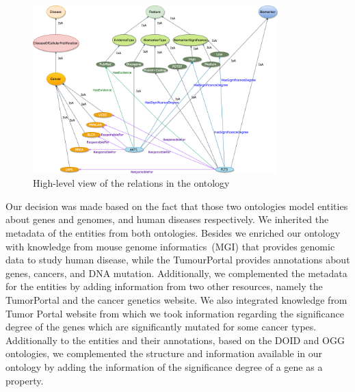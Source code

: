 \begin{figure}
	\centering
	\includegraphics[width=0.8\linewidth,height=65mm]{images/GeneralRelations-Ontology.png}
	\caption{High-level view of the relations in the ontology}
	\label{fig:main_ontology_relations}
	\vspace{-4mm}
\end{figure}

\hspace*{3.5mm} Our decision was made based on the fact that those two ontologies model entities about genes and genomes, and human diseases respectively. We inherited the metadata of the entities from both ontologies. Besides we enriched our ontology with knowledge from mouse genome informatics~(MGI) that provides genomic data to study human disease, while the TumourPortal provides annotations about genes, cancers, and DNA mutation. Additionally, we complemented the metadata for the entities by adding information from two other resources, namely the TumorPortal and the cancer genetics website. We also integrated knowledge from Tumor Portal website from which we took information regarding the significance degree of the genes which are significantly mutated for some cancer types. Additionally to the entities and their annotations, based on the DOID and OGG ontologies, we complemented the structure and information available in our ontology by adding the information of the significance degree of a gene as a property. 

